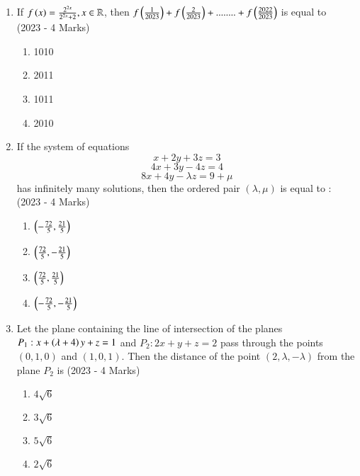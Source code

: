 \documentclass[journal]{IEEEtran}
\begin{document}
\begin{enumerate}
{        }
    \item{
     		If $f\left(x\right) = \frac{2^{2x}}{2^{2x}+2}, x\in \mathbb{R}$, then $f\left(\frac{1}{2023}\right)+ f\left(\frac{2}{2023}\right)+........+ f\left(\frac{2022}{2023}\right)$ is equal to \\ \text{ }
            \hfill
            {(2023 - 4 Marks)}
            \begin{multicols}{4}
                \begin{enumerate}
                	\item 1010
                	\item 2011
                	\item 1011
                	\item 2010
                \end{enumerate}
            \end{multicols}
        
        }
    \item{
            If the system of equations
            \[x + 2y + 3z = 3\]
            \[4x + 3y - 4z = 4\]
            \[8x + 4y - \lambda z = 9 + \mu\]
            has infinitely many solutions, then the ordered pair
            \((\lambda, \mu)\) is equal to : \\ \text{ }
           	\hfill
                {(2023 - 4 Marks)}
            
           \begin{multicols}{4}
            	\begin{enumerate}
            		\item $\left(-\frac{72}{5},\frac{21}{5}\right)$
            		\item $\left(\frac{72}{5},-\frac{21}{5}\right)$
            		\item $\left(\frac{72}{5},\frac{21}{5}\right)$
            		\item $\left(-\frac{72}{5},-\frac{21}{5}\right)$
            	\end{enumerate}
            \end{multicols}
        
        }
 	\item{
        	Let the plane containing the line of intersection of the planes $P_{1}: x + \left(\lambda+4\right)y + z = 1$ and $P_{2}: 2x + y + z = 2$ pass through the points $(0, 1, 0)$ and $(1, 0, 1)$. Then the distance of the point $(2, \lambda,- \lambda)$ from the plane $P_{2}$ is
        	\hfill
        	{(2023 - 4 Marks)}
        	
        	\begin{multicols}{4}
        		\begin{enumerate}
        			\item $4\sqrt{6}$
        			\item $3\sqrt{6}$
        			\item $5\sqrt{6}$
        			\item $2\sqrt{6}$
        		\end{enumerate}
        	\end{multicols}
        	
}
\end{enumerate}
\end{document}

